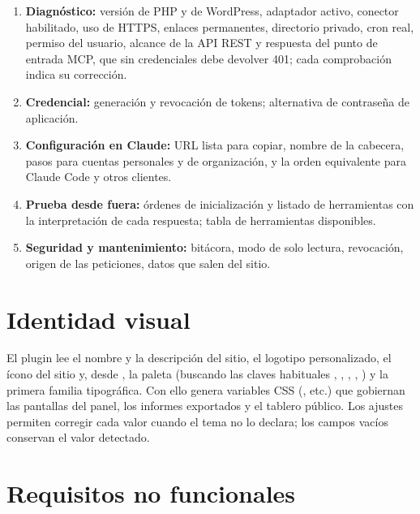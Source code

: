 \documentclass[11pt,a4paper]{article}
\begin{document}
\begin{enumerate}
\item \textbf{Diagnóstico:} versión de PHP y de WordPress, adaptador activo, conector habilitado, uso de HTTPS, enlaces permanentes, directorio privado, cron real, permiso del usuario, alcance de la API REST y respuesta del punto de entrada MCP, que sin credenciales debe devolver 401; cada comprobación indica su corrección.
\item \textbf{Credencial:} generación y revocación de tokens; alternativa de contraseña de aplicación.
\item \textbf{Configuración en Claude:} URL lista para copiar, nombre de la cabecera, pasos para cuentas personales y de organización, y la orden equivalente para Claude Code y otros clientes.
\item \textbf{Prueba desde fuera:} órdenes  de inicialización y listado de herramientas con la interpretación de cada respuesta; tabla de herramientas disponibles.
\item \textbf{Seguridad y mantenimiento:} bitácora, modo de solo lectura, revocación, origen de las peticiones, datos que salen del sitio.
\end{enumerate}

\section{Identidad visual}

El plugin lee el nombre y la descripción del sitio, el logotipo personalizado, el ícono del sitio y, desde , la paleta (buscando las claves habituales , , , , ) y la primera familia tipográfica. Con ello genera variables CSS (, etc.) que gobiernan las pantallas del panel, los informes exportados y el tablero público. Los ajustes permiten corregir cada valor cuando el tema no lo declara; los campos vacíos conservan el valor detectado.

\section{Requisitos no funcionales}
\end{document}
